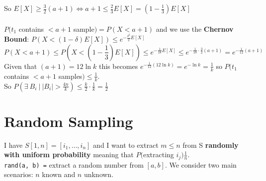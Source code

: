 \documentclass[10pt]{report}
\begin{document}
So $E[X]\geq \frac{3}{2}(a+1) \Leftrightarrow a+1 \leq \frac{2}{3}E[X] = (1-\frac{1}{3})E[X]$\\\\
$P(t_1$ contains $< a+1$ sample$) = P(X < a+1)$ and we use the \textbf{Chernov Bound}: $P(X < (1-\delta)E[X]) \leq e^{-\frac{\delta^2}{2}E[X]}$
$$P(X<a+1)\leq P(X<(1-\frac{1}{3})E[X]) \leq e^{-\frac{1}{18}E[X]} \leq e^{-\frac{1}{18}\cdot\frac{3}{2}(a+1)} = e^{-\frac{1}{12}(a+1)}$$
Given that $(a+1)=12\ln k$ this becomes $e^{-\frac{1}{12}(12\ln k)} = e^{-\ln k} = \frac{1}{k}$ so $P(t_1$ contains $< a+1$ samples$) \leq \frac{1}{k}$.\\
So $P(\exists\: B_i\:|\:|B_i|>\frac{4n}{k})\leq \frac{k}{2}\cdot\frac{1}{k} = \frac{1}{2}$
\section{Random Sampling}
I have $S[1,n] = [i_1,\ldots,i_n]$ and I want to extract $m \leq n$ from S \textbf{randomly with uniform probability} meaning that $P($extracting $i_j)\frac{1}{n}$.\\
\texttt{rand(a, b) =} extract a random number from $[a,b]$. We consider two main scenarios: $n$ known and $n$ unknown.
\end{document}
